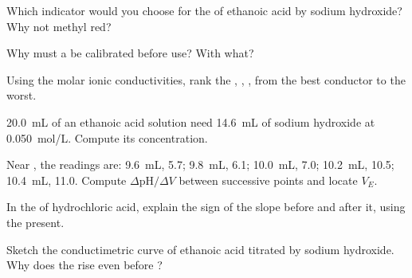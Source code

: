 \begin{exercise}[$\star$]\label{exo:g12:ph-conductivity-titrations:3}
Which indicator would you choose for the  of ethanoic acid by
sodium hydroxide? Why not methyl red?
\end{exercise}

\begin{exercise}[$\star$]\label{exo:g12:ph-conductivity-titrations:4}
Why must a  be calibrated before use? With what?
\end{exercise}

\begin{exercise}[$\star$]\label{exo:g12:ph-conductivity-titrations:5}
Using the molar ionic conductivities, rank the  , ,
,  from the best conductor to the worst.
\end{exercise}

\begin{exercise}[$\star\star$]\label{exo:g12:ph-conductivity-titrations:6}
\qty{20.0}{mL} of an ethanoic acid solution need \qty{14.6}{mL} of
sodium hydroxide at \qty{0.050}{mol/L}. Compute its concentration.
\end{exercise}

\begin{exercise}[$\star\star$]\label{exo:g12:ph-conductivity-titrations:7}
Near , the readings are: \qty{9.6}{mL},  5.7;
\qty{9.8}{mL}, 6.1; \qty{10.0}{mL}, 7.0; \qty{10.2}{mL}, 10.5;
\qty{10.4}{mL}, 11.0. Compute $\Delta\mathrm{pH}/\Delta V$ between
successive points and locate $V_E$.
\end{exercise}

\begin{exercise}[$\star\star$]\label{exo:g12:ph-conductivity-titrations:8}
In the  of hydrochloric acid, explain the sign of
the slope before  and after it, using the  present.
\end{exercise}

\begin{exercise}[$\star\star$]\label{exo:g12:ph-conductivity-titrations:9}
Sketch the conductimetric curve of ethanoic acid titrated by sodium
hydroxide. Why does the  rise even before ?
\end{exercise}

